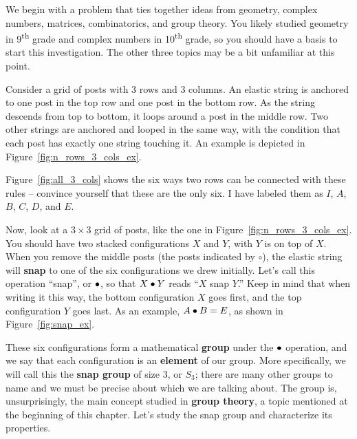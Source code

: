 \documentclass[../gatm.tex]{subfiles}
\begin{document}

\noindent We begin with a problem that ties together ideas from geometry, complex numbers, matrices, combinatorics, and group theory. You likely studied geometry in 9\textsuperscript{th} grade and complex numbers in 10\textsuperscript{th} grade, so you should have a basis to start this investigation. The other three topics may be a bit unfamiliar at this point.

Consider a grid of posts with $3$ rows and $3$ columns. An elastic string is anchored to one post in the top row and one post in the bottom row. As the string descends from top to bottom, it loops around a post in the middle row. Two other strings are anchored and looped in the same way, with the condition that each post has exactly one string touching it. An example is depicted in Figure~\ref{fig:n_rows_3_cols_ex}.

Figure~\ref{fig:all_3_cols} shows the six ways two rows can be connected with these rules -- convince yourself that these are the only six. I have labeled them as $I$, $A$, $B$, $C$, $D$, and $E$.

Now, look at a $3\times 3$ grid of posts, like the one in Figure~\ref{fig:n_rows_3_cols_ex}. You should have two stacked configurations $X$ and $Y$, with $Y$ is on top of $X$. When you remove the middle posts (the posts indicated by $\circ$), the elastic string will \textbf{snap} to one of the six configurations we drew initially. Let's call this operation ``snap'', or $\bullet$, so that $X\bullet Y$ reads ``$X$ snap $Y$.'' Keep in mind that when writing it this way, the bottom configuration $X$ goes first, and the top configuration $Y$ goes last. As an example, $A\bullet B = E$, as shown in Figure~\ref{fig:snap_ex}.

These six configurations form a mathematical \textbf{group} under the $\bullet$ operation, and we say that each configuration is an \textbf{element} of our group. More specifically, we will call this the \textbf{snap group} of size $3$, or $S_3$; there are many other groups to name and we must be precise about which we are talking about. The group is, unsurprisingly, the main concept studied in \textbf{group theory}, a topic mentioned at the beginning of this chapter. Let's study the snap group and characterize its properties.

\end{document}
